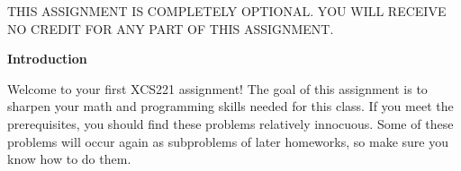 \LARGE

THIS ASSIGNMENT IS COMPLETELY OPTIONAL.  YOU WILL RECEIVE NO CREDIT FOR ANY PART OF THIS ASSIGNMENT.

\normalsize

{\bf Introduction}

Welcome to your first XCS221 assignment! The goal of this assignment is to
sharpen your math and programming skills needed for this class. If you meet the
prerequisites, you should find these problems relatively innocuous. Some of
these problems will occur again as subproblems of later homeworks, so make sure
you know how to do them.
